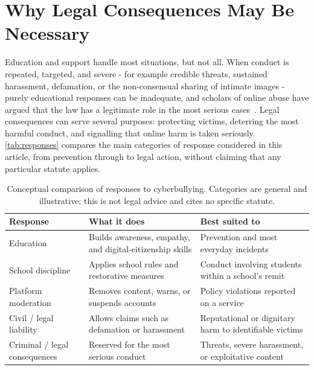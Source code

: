 \documentclass[11pt,a4paper]{report}
\begin{document}
\chapter{Why Legal Consequences May Be Necessary}
Education and support handle most situations, but not all. When conduct is
repeated, targeted, and severe - for example credible threats, sustained
harassment, defamation, or the non-consensual sharing of intimate images -
purely educational responses can be inadequate, and scholars of online abuse
have argued that the law has a legitimate role in the most serious
cases~\cite{citron2014}. Legal consequences can serve several purposes:
protecting victims, deterring the most harmful conduct, and signalling that
online harm is taken seriously. \autoref{tab:responses} compares the main
categories of response considered in this article, from prevention through to
legal action, without claiming that any particular statute applies.
\begin{table}[ht]
  \centering
  \small
  \caption{Conceptual comparison of responses to cyberbullying. Categories are
    general and illustrative; this is not legal advice and cites no specific
    statute.}
  \label{tab:responses}
  \begin{tabular}{@{}p{3.0cm}p{5.0cm}p{4.6cm}@{}}
    \toprule
    \textbf{Response} & \textbf{What it does} & \textbf{Best suited to} \\
    \midrule
    Education & Builds awareness, empathy, and digital-citizenship skills &
      Prevention and most everyday incidents \\
    School discipline & Applies school rules and restorative measures &
      Conduct involving students within a school's remit \\
    Platform moderation & Removes content, warns, or suspends accounts &
      Policy violations reported on a service \\
    Civil / legal liability & Allows claims such as defamation or harassment &
      Reputational or dignitary harm to identifiable victims \\
    Criminal / legal consequences & Reserved for the most serious conduct &
      Threats, severe harassment, or exploitative content \\
    \bottomrule
  \end{tabular}
\end{table}
\end{document}
